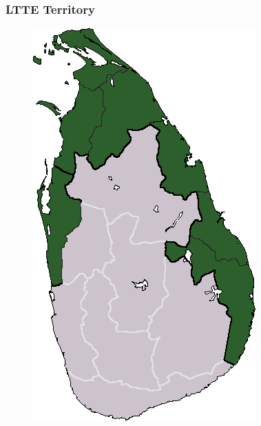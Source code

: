 \documentclass{beamer}
\begin{document}
\begin{frame} 
	\frametitle{\LARGE{LTTE Territory}}
	\begin{figure}[ht!]
		\centering
		\includegraphics[width=\textwidth,height=0.9\textheight,keepaspectratio]{LTTEterritory.png}
	\end{figure}
\end{frame}
\end{document}

